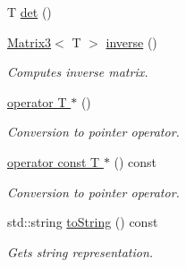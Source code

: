 \begin{DoxyCompactItemize}
T \hyperlink{class_matrix3_a4cba34533d0f88feb8a622e5c5b7052d}{det} ()
\item 
\hyperlink{class_matrix3}{Matrix3}$<$ T $>$ \hyperlink{class_matrix3_aad3810622196a42d5f1a58e7d49d1417}{inverse} ()
\begin{DoxyCompactList}\small\item\em Computes inverse matrix. \item\end{DoxyCompactList}\item 
\hyperlink{class_matrix3_a643aecc11c95f9706a7620deab32a4ee}{operator T $\ast$} ()
\begin{DoxyCompactList}\small\item\em Conversion to pointer operator. \item\end{DoxyCompactList}\item 
\hyperlink{class_matrix3_a103a13ad3c2c32985e6e10adb91088f2}{operator const T $\ast$} () const 
\begin{DoxyCompactList}\small\item\em Conversion to pointer operator. \item\end{DoxyCompactList}\item 
std::string \hyperlink{class_matrix3_a4208a1713fc7fb654a88eb7b82ef3b02}{toString} () const 
\begin{DoxyCompactList}\small\item\em Gets string representation. \item\end{DoxyCompactList}\end{DoxyCompactItemize}
